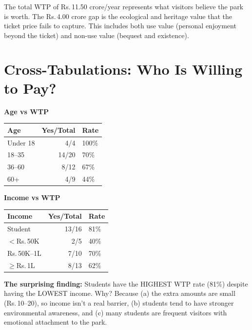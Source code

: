 \documentclass[11pt, a4paper]{article}
\newcommand{\rupee}{Rs.\,}
\newenvironment{keybox}{%
    \def\FrameCommand{\textcolor{accent}{\vrule width 2pt}\hspace{8pt}}%
    \MakeFramed{\advance\hsize-\width\FrameRestore}%
}{%
    \endMakeFramed%
}
\begin{document}
\begin{keybox}
The total WTP of \rupee 11.50 crore/year represents what visitors believe the park is worth. The \rupee 4.00 crore gap is the ecological and heritage value that the ticket price fails to capture. This includes both use value (personal enjoyment beyond the ticket) and non-use value (bequest and existence).
\end{keybox}

\section{Cross-Tabulations: Who Is Willing to Pay?}

\begin{table}[h]
\centering
\begin{minipage}{0.48\textwidth}
\centering
\textbf{Age vs WTP}\\[4pt]
\begin{tabular}{lrl}
\toprule
\textbf{Age} & \textbf{Yes/Total} & \textbf{Rate} \\
\midrule
Under 18 & 4/4 & 100\% \\
18--35 & 14/20 & 70\% \\
36--60 & 8/12 & 67\% \\
60+ & 4/9 & 44\% \\
\bottomrule
\end{tabular}
\end{minipage}
\hfill
\begin{minipage}{0.48\textwidth}
\centering
\textbf{Income vs WTP}\\[4pt]
\begin{tabular}{lrl}
\toprule
\textbf{Income} & \textbf{Yes/Total} & \textbf{Rate} \\
\midrule
Student & 13/16 & 81\% \\
$<$\rupee 50K & 2/5 & 40\% \\
\rupee 50K--1L & 7/10 & 70\% \\
$\geq$\rupee 1L & 8/13 & 62\% \\
\bottomrule
\end{tabular}
\end{minipage}
\end{table}

\textbf{The surprising finding:} Students have the HIGHEST WTP rate (81\%) despite having the LOWEST income. Why? Because (a) the extra amounts are small (\rupee 10--20), so income isn't a real barrier, (b) students tend to have stronger environmental awareness, and (c) many students are frequent visitors with emotional attachment to the park.
\end{document}
